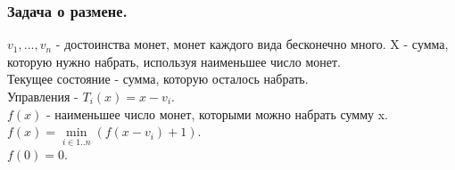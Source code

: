 \subsubsection{Задача о размене.}
$v_1, ... , v_n$ - достоинства монет, монет каждого вида бесконечно много. X - сумма, которую нужно набрать, используя наименьшее число монет.\\
Текущее состояние - сумма, которую осталось набрать.\\
Управления - $T_i(x) = x - v_i$.\\
$f(x)$ - наименьшее число монет, которыми можно набрать сумму x.\\
$f(x) = \min\limits_{i \in 1..n}(f(x - v_i) + 1)$.\\
$f(0) = 0$.\\
